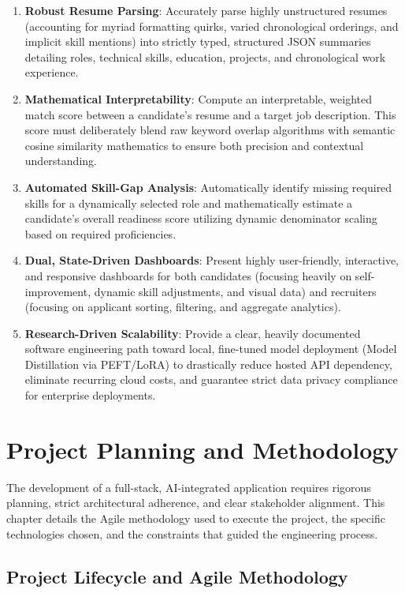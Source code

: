 \documentclass[12pt,a4paper]{report}
\begin{document}
\begin{enumerate}
    \item \textbf{Robust Resume Parsing}: Accurately parse highly unstructured resumes (accounting for myriad formatting quirks, varied chronological orderings, and implicit skill mentions) into strictly typed, structured JSON summaries detailing roles, technical skills, education, projects, and chronological work experience.
    \item \textbf{Mathematical Interpretability}: Compute an interpretable, weighted match score between a candidate's resume and a target job description. This score must deliberately blend raw keyword overlap algorithms with semantic cosine similarity mathematics to ensure both precision and contextual understanding.
    \item \textbf{Automated Skill-Gap Analysis}: Automatically identify missing required skills for a dynamically selected role and mathematically estimate a candidate's overall readiness score utilizing dynamic denominator scaling based on required proficiencies.
    \item \textbf{Dual, State-Driven Dashboards}: Present highly user-friendly, interactive, and responsive dashboards for both candidates (focusing heavily on self-improvement, dynamic skill adjustments, and visual data) and recruiters (focusing on applicant sorting, filtering, and aggregate analytics).
    \item \textbf{Research-Driven Scalability}: Provide a clear, heavily documented software engineering path toward local, fine-tuned model deployment (Model Distillation via PEFT/LoRA) to drastically reduce hosted API dependency, eliminate recurring cloud costs, and guarantee strict data privacy compliance for enterprise deployments.
\end{enumerate}

\chapter{Project Planning and Methodology}

The development of a full-stack, AI-integrated application requires rigorous planning, strict architectural adherence, and clear stakeholder alignment. This chapter details the Agile methodology used to execute the project, the specific technologies chosen, and the constraints that guided the engineering process.

\section{Project Lifecycle and Agile Methodology}
\end{document}
